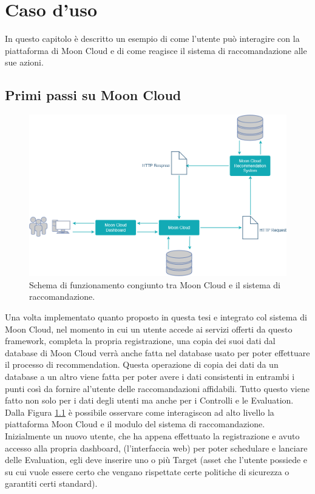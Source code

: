 \chapter{Caso d'uso}\label{chp:05-usecase}
In questo capitolo è descritto un esempio di come l'utente può interagire con la piattaforma di Moon Cloud e di come reagisce 
il sistema di raccomandazione alle sue azioni.
%
\section*{Primi passi su Moon Cloud}
\begin{figure}[ht!]
    \centering
    \includegraphics[scale=0.38]{images/UML_MoonCloud_HowToDo.png}
    \caption[Schema di funzionamento di questa soluzione]{Schema di funzionamento congiunto tra Moon Cloud e il sistema di raccomandazione.}
    \label{fig:UML_MoonCloud_HowToDo}
\end{figure}
\hfill\break
Una volta implementato quanto proposto in questa tesi e integrato col sistema di Moon Cloud, nel momento in cui un utente 
accede ai servizi offerti da questo framework, completa la propria registrazione, una copia dei suoi dati dal database di 
Moon Cloud verrà anche fatta nel database usato per poter effettuare il processo di recommendation. Questa operazione di 
copia dei dati da un database a un altro viene fatta per poter avere i dati consistenti in entrambi i punti così da 
fornire al'utente delle raccomandazioni affidabili. Tutto questo viene fatto non solo per i dati degli utenti ma anche 
per i Controlli e le Evaluation. Dalla Figura \ref{fig:UML_MoonCloud_HowToDo} è possibile osservare come interagiscon 
ad alto livello la piattaforma Moon Cloud e il modulo del sistema di raccomandazione.\hfill\break
Inizialmente un nuovo utente, che ha appena effettuato la registrazione e avuto accesso alla propria dashboard, (l'interfaccia 
web) per poter schedulare e lanciare delle Evaluation, egli deve inserire uno o più Target (asset che l'utente possiede e su 
cui vuole essere certo che vengano rispettate certe politiche di sicurezza o garantiti certi standard).
%
